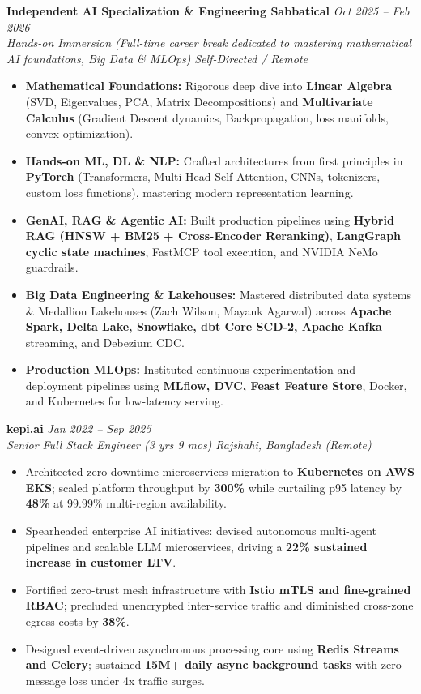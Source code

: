 \documentclass[9.5pt,a4paper]{article}
\begin{document}
\vspace{2.0pt}
\noindent\textbf{Independent AI Specialization \& Engineering Sabbatical} \hfill {\small\textit{Oct 2025 -- Feb 2026}}\\
\textit{Hands-on Immersion (Full-time career break dedicated to mastering mathematical AI foundations, Big Data \& MLOps)} \hfill {\footnotesize\textit{Self-Directed / Remote}}
\begin{itemize}
    \item \textbf{Mathematical Foundations:} Rigorous deep dive into \textbf{Linear Algebra} (SVD, Eigenvalues, PCA, Matrix Decompositions) and \textbf{Multivariate Calculus} (Gradient Descent dynamics, Backpropagation, loss manifolds, convex optimization).
    \item \textbf{Hands-on ML, DL \& NLP:} Crafted architectures from first principles in \textbf{PyTorch} (Transformers, Multi-Head Self-Attention, CNNs, tokenizers, custom loss functions), mastering modern representation learning.
    \item \textbf{GenAI, RAG \& Agentic AI:} Built production pipelines using \textbf{Hybrid RAG (HNSW + BM25 + Cross-Encoder Reranking)}, \textbf{LangGraph cyclic state machines}, FastMCP tool execution, and NVIDIA NeMo guardrails.
    \item \textbf{Big Data Engineering \& Lakehouses:} Mastered distributed data systems \& Medallion Lakehouses (Zach Wilson, Mayank Agarwal) across \textbf{Apache Spark, Delta Lake, Snowflake, dbt Core SCD-2, Apache Kafka} streaming, and Debezium CDC.
    \item \textbf{Production MLOps:} Instituted continuous experimentation and deployment pipelines using \textbf{MLflow, DVC, Feast Feature Store}, Docker, and Kubernetes for low-latency serving.
\end{itemize}

\vspace{2.0pt}
\noindent\textbf{kepi.ai} \hfill {\small\textit{Jan 2022 -- Sep 2025}}\\
\textit{Senior Full Stack Engineer (3 yrs 9 mos)} \hfill {\footnotesize\textit{Rajshahi, Bangladesh (Remote)}}
\begin{itemize}
    \item Architected zero-downtime microservices migration to \textbf{Kubernetes on AWS EKS}; scaled platform throughput by \textbf{300\%} while curtailing p95 latency by \textbf{48\%} at 99.99\% multi-region availability.
    \item Spearheaded enterprise AI initiatives: devised autonomous multi-agent pipelines and scalable LLM microservices, driving a \textbf{22\% sustained increase in customer LTV}.
    \item Fortified zero-trust mesh infrastructure with \textbf{Istio mTLS and fine-grained RBAC}; precluded unencrypted inter-service traffic and diminished cross-zone egress costs by \textbf{38\%}.
    \item Designed event-driven asynchronous processing core using \textbf{Redis Streams and Celery}; sustained \textbf{15M+ daily async background tasks} with zero message loss under 4x traffic surges.
\end{itemize}
\end{document}
